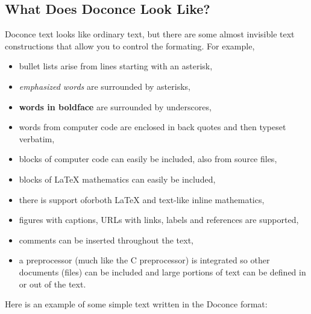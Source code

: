 \documentclass{article}
\begin{document}
\subsection*{What Does Doconce Look Like?}

Doconce text looks like ordinary text, but there are some almost invisible
text constructions that allow you to control the formating. For example,

\begin{itemize}
  \item bullet lists arise from lines starting with an asterisk,

  \item \emph{emphasized words} are surrounded by asterisks, 

  \item \textbf{words in boldface} are surrounded by underscores, 

  \item words from computer code are enclosed in back quotes and 
    then typeset verbatim,

  \item blocks of computer code can easily be included, also from source files,

  \item blocks of LaTeX mathematics can easily be included,

  \item there is support oforboth LaTeX and text-like inline mathematics,

  \item figures with captions, URLs with links, labels and references
    are supported,

  \item comments can be inserted throughout the text,

  \item a preprocessor (much like the C preprocessor) is integrated so
    other documents (files) can be included and large portions of text
    can be defined in or out of the text.

\end{itemize}
Here is an example of some simple text written in the Doconce format:
\end{document}
